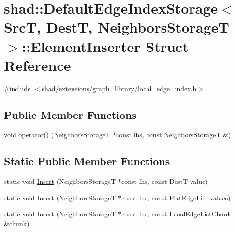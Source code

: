 \hypertarget{structshad_1_1DefaultEdgeIndexStorage_1_1ElementInserter}{\section{shad\-:\-:Default\-Edge\-Index\-Storage$<$ Src\-T, Dest\-T, Neighbors\-Storage\-T $>$\-:\-:Element\-Inserter Struct Reference}
\label{structshad_1_1DefaultEdgeIndexStorage_1_1ElementInserter}
}


{\ttfamily \#include $<$shad/extensions/graph\-\_\-library/local\-\_\-edge\-\_\-index.\-h$>$}

\subsection*{Public Member Functions}
\begin{DoxyCompactItemize}
\item 
void \hyperlink{structshad_1_1DefaultEdgeIndexStorage_1_1ElementInserter_a32fa13089c284d0c4e49a78f77a32401}{operator()} (Neighbors\-Storage\-T $\ast$const lhs, const Neighbors\-Storage\-T \&)
\end{DoxyCompactItemize}
\subsection*{Static Public Member Functions}
\begin{DoxyCompactItemize}
\item 
static void \hyperlink{structshad_1_1DefaultEdgeIndexStorage_1_1ElementInserter_aa8be4546469e47a794bd9a51b790c3af}{Insert} (Neighbors\-Storage\-T $\ast$const lhs, const Dest\-T value)
\item 
static void \hyperlink{structshad_1_1DefaultEdgeIndexStorage_1_1ElementInserter_ae8fb1add56dd442b4a675052f210a6c7}{Insert} (Neighbors\-Storage\-T $\ast$const lhs, const \hyperlink{structshad_1_1DefaultEdgeIndexStorage_1_1FlatEdgeList}{Flat\-Edge\-List} values)
\item 
static void \hyperlink{structshad_1_1DefaultEdgeIndexStorage_1_1ElementInserter_a7de53ee4e4e5d05677cf8fb28235a23f}{Insert} (Neighbors\-Storage\-T $\ast$const lhs, const \hyperlink{structshad_1_1DefaultEdgeIndexStorage_1_1LocalEdgeListChunk}{Local\-Edge\-List\-Chunk} \&chunk)
\end{DoxyCompactItemize}


